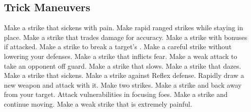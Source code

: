 \subsection{Trick Maneuvers}\label{Trick Maneuvers}
\begin{spelllist}
 Make a strike that sickens with pain.
 Make rapid ranged strikes while staying in place.
 Make a strike that trades damage for accuracy.
 Make a strike with bonuses if attacked.
 Make a strike to break a target's .
 Make a careful strike without lowering your defenses.
 Make a strike that inflicts fear.
 Make a weak attack to take an opponent off guard.
 Make a strike that slows.
 Make a strike that dazes.
 Make a strike that sickens.
 Make a strike against Reflex defense.
 Rapidly draw a new weapon and attack with it.
 Make two strikes.
 Make a strike and back away from your target.
 Attack vulnerabilities in focusing foes.
 Make a strike and continue moving.
 Make a weak strike that is extremely painful.
\end{spelllist}



\small
